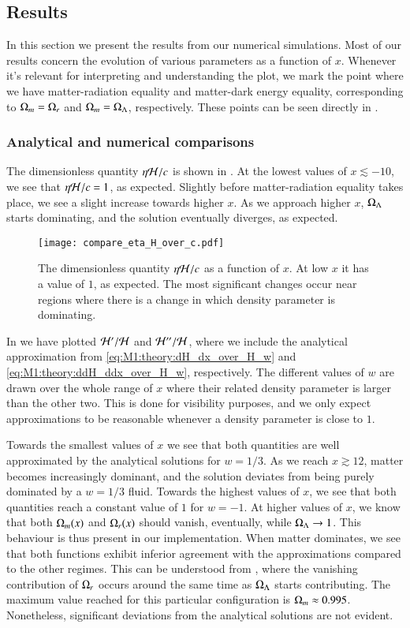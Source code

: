\subsection{Results}\label{ssec:M1:results}
In this section we present the results from our numerical simulations. Most of our results concern the evolution of various parameters as a function of $x$. Whenever it's relevant for interpreting and understanding the plot, we mark the point where we have matter-radiation equality and matter-dark energy equality, corresponding to $\Omega_{m}=\Omega_{r}$ and $\Omega_{m}=\Omega_{\Lambda}$, respectively. These points can be seen directly in . 

\subsubsection{Analytical and numerical comparisons}
The dimensionless quantity $\eta\mathcal{H}/c$ is shown in . At the lowest values of $x\lesssim-10$, we see that $\eta\mathcal{H}/c=1$, as expected. Slightly before matter-radiation equality takes place, we see a slight increase towards higher $x$. As we approach higher $x$, $\Omega_{\Lambda}$ starts dominating, and the solution eventually diverges, as expected.  
\begin{figure}[ht!]
    \texttt{[image: compare\_eta\_H\_over\_c.pdf]}
    \caption{The dimensionless quantity $\eta\mathcal{H}/c$ as a function of $x$. At low $x$ it has a value of $1$, as expected. The most significant changes occur near regions where there is a change in which density parameter is dominating.}
    \label{fig:M1:eta_H_over_c}
\end{figure}

In  we have plotted $\mathcal{H}'/\mathcal{H}$ and $\mathcal{H}''/\mathcal{H}$, where we include the analytical approximation from \eqref{eq:M1:theory:dH_dx_over_H_w} and \eqref{eq:M1:theory:ddH_ddx_over_H_w}, respectively. The different values of $w$ are drawn over the whole range of $x$ where their related density parameter is larger than the other two. This is done for visibility purposes, and we only expect approximations to be reasonable whenever a density parameter is close to $1$. 

Towards the smallest values of $x$ we see that both quantities are well approximated by the analytical solutions for $w=1/3$. As we reach $x\gtrsim12$, matter becomes increasingly dominant, and the solution deviates from being purely dominated by a $w=1/3$ fluid. Towards the highest values of $x$, we see that both quantities reach a constant value of $1$ for $w=-1$. At higher values of $x$, we know that both $\Omega_{m}(x)$ and $\Omega_{r}(x)$ should vanish, eventually, while $\Omega_{\Lambda}\to1$. This behaviour is thus present in our implementation. When matter dominates, we see that both functions exhibit inferior agreement with the approximations compared to the other regimes. This can be understood from , where the vanishing contribution of $\Omega_{r}$ occurs around the same time as $\Omega_{\Lambda}$ starts contributing. The maximum value reached for this particular configuration is $\Omega_{m}\approx0.995$. Nonetheless, significant deviations from the analytical solutions are not evident.
 
